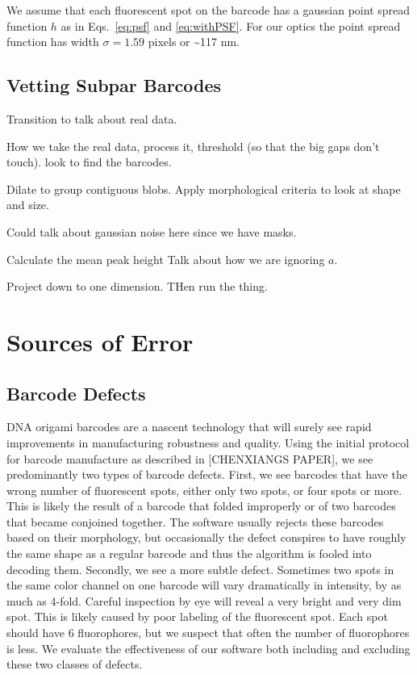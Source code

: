 We assume that each fluorescent spot on the barcode has a gaussian point spread function $h$ as in Eqs.~\ref{eq:psf} and \ref{eq:withPSF}. For our optics the point spread function has width  $\sigma=1.59$ pixels or \textasciitilde 117 nm. 



\subsection{Vetting Subpar Barcodes}

Transition to talk about real data.

How we take the real data, process it, threshold (so that the big gaps don't touch). look to find the barcodes.  

Dilate to group contiguous blobs. Apply morphological criteria to look at shape and size.

Could talk about gaussian noise here since we have masks.

Calculate the mean peak height
Talk about how we are ignoring $a$.

Project  down to one dimension.  THen run the thing.

\section{Sources of Error}



\subsection{Barcode Defects}
DNA origami barcodes are a nascent technology that will surely see rapid improvements in manufacturing robustness and quality. Using the initial protocol for barcode manufacture as described in [CHENXIANGS PAPER], we see predominantly two types of barcode defects. First, we see barcodes that have the wrong number of fluorescent spots, either only two spots, or four spots or more. This is likely the result of a barcode that folded improperly or of two barcodes that became conjoined together. The software usually rejects these barcodes based on their morphology, but occasionally the defect conspires to have roughly the same shape as a regular barcode and thus the algorithm is fooled into decoding them. Secondly, we see a more subtle defect. Sometimes two spots in the same color channel on one barcode will vary dramatically in intensity, by as much as 4-fold. Careful inspection by eye will reveal a very bright and very dim spot. This is likely caused by poor labeling of the fluorescent spot. Each spot should have 6 fluorophores, but we suspect that often the number of fluorophores is less. We evaluate the effectiveness of our software both including and excluding these two classes of defects.    


